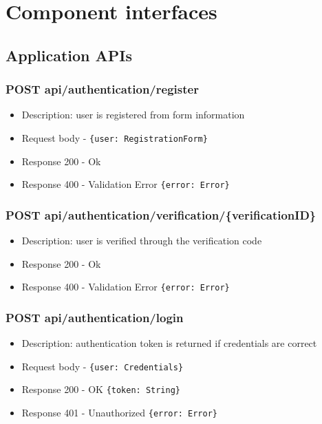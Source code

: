 \section{Component interfaces}

\subsection{Application APIs}

\subsubsection{POST api/authentication/register}
\begin{itemize}
    \item Description: user is registered from form information
    \item Request body - \verb|{user: RegistrationForm}|
    \item Response 200 - Ok
    \item Response 400 - Validation Error \verb|{error: Error}|
\end{itemize}

\subsubsection{POST api/authentication/verification/\{verificationID\}}
\begin{itemize}
    \item Description: user is verified through the verification code
    \item Response 200 - Ok
    \item Response 400 - Validation Error \verb|{error: Error}|
\end{itemize}

\subsubsection{POST api/authentication/login}
\begin{itemize}
    \item Description: authentication token is returned if credentials are correct
    \item Request body - \verb|{user: Credentials}|
    \item Response 200 - OK \verb|{token: String}|
    \item Response 401 - Unauthorized \verb|{error: Error}|
\end{itemize}

